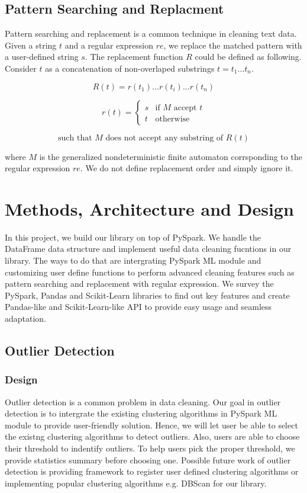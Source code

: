\documentclass[sigconf]{acmart}
\begin{document}
\subsection{Pattern Searching and Replacment}
Pattern searching and replacement is a common technique in cleaning text data. Given a string $t$ and a regular expression\cite{theory_com} $re$, we replace the matched pattern with a user-defined string $s$. The replacement function $R$ could be defined as following.
Consider $t$ as a concatenation of non-overlaped substrings $t = t_1...t_n$.

\[ R(t) =  r(t_1)...r(t_i)...r(t_n)\]

\[r(t) = \begin{cases} s & \text{if $M$ accept $t$} \\ t & \text{otherwise} \end{cases}\]

\[\text{such that $M$ does not accept any substring of } R(t)\]

where $M$ is the generalized nondeterministic finite automaton\cite{theory_com} corrsponding to the regular expression $re$. We do not define replacement order and simply ignore it.


\section{Methods, Architecture and Design}
In this project, we build our library on top of PySpark. We handle the DataFrame data structure and implement useful data cleaning fucntions in our library. The ways to do that are intergrating PySpark ML module and customizing user define functions to perform advanced cleaning features such as pattern searching and replacement with regular expression. We survey the PySpark\cite{pyspark}, Pandas\cite{pandas} and Scikit-Learn\cite{scikit-learn} libraries to find out key features and create Pandas-like and Scikit-Learn-like API to provide easy usage and seamless adaptation.

\subsection{Outlier Detection}
\subsubsection{Design} 
Outlier detection is a common problem in data cleaning. Our goal in outlier detection is to intergrate the existing clustering algorithms in PySpark ML module to provide user-friendly solution. Hence, we will let user be able to select the existng clustering algorithms to detect outliers. Also, users are able to choose their threshold to indentify outliers. To help users pick the proper threshold, we provide statistics summary before choosing one. Possible future work of outlier detection is providing framework to register user defined clustering algorithms or implementing popular clustering algorithms e.g. DBScan\cite{DBScan} for our library.
\end{document}
